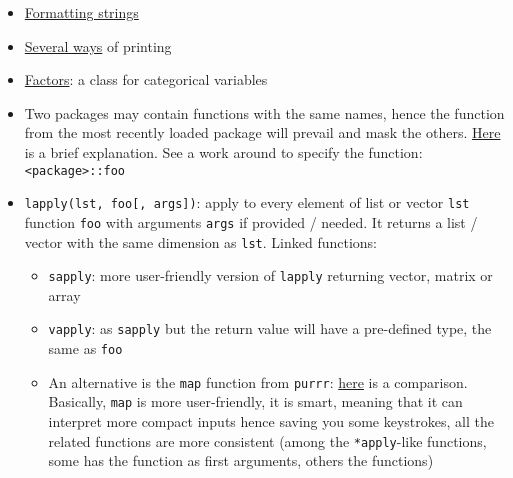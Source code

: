 \documentclass[a4paper,12pt,%
              final%
              ]{article}
\begin{document}
\begin{itemize}
  \item \href{https://stackoverflow.com/questions/46085274/is-there-a-string-formatting-operator-in-r-similar-to-pythons}{Formatting strings}
  \item \href{https://www.geeksforgeeks.org/printing-output-of-an-r-program/}{Several ways} of printing
  \item \href{https://www.datamentor.io/r-programming/factor/}{Factors}: a class for categorical variables
  \item Two packages may contain functions with the same names, hence the function from the most recently loaded package will prevail and mask the others. \href{https://stackoverflow.com/questions/39137110/what-does-the-following-object-is-masked-from-packagexxx-mean}{Here} is a brief explanation. See a work around to specify the function: \verb|<package>::foo|
  \item \verb|lapply(lst, foo[, args])|: apply to every element of list or vector \verb|lst| function \verb|foo| with arguments \verb|args| if provided / needed. It returns a list / vector with the same dimension as \verb|lst|. Linked functions:
    \begin{itemize}
      \item \verb|sapply|: more user-friendly version of \verb|lapply| returning vector, matrix or array
      \item \verb|vapply|: as \verb|sapply| but the return value will have a pre-defined type, the same as \verb|foo|
      \item An alternative is the \verb|map| function from \texttt{purrr}: \href{https://stackoverflow.com/questions/45101045/why-use-purrrmap-instead-of-lapply}{here} is a comparison. Basically, \verb|map| is more user-friendly, it is smart, meaning that it can interpret more compact inputs hence saving you some keystrokes, all the related functions are more consistent (among the \verb|*apply|-like functions, some has the function as first arguments, others the functions)
    \end{itemize}
\end{itemize}

\end{document}
